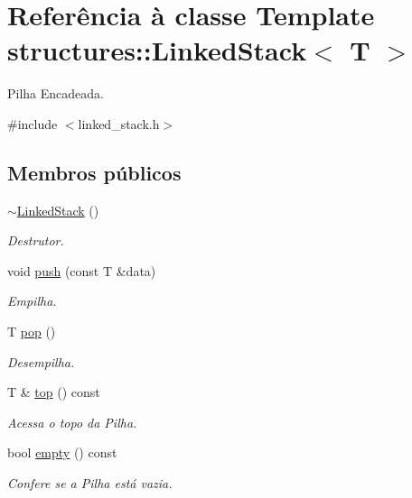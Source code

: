 \hypertarget{classstructures_1_1_linked_stack}{}\section{Referência à classe Template structures\+::Linked\+Stack$<$ T $>$}
\label{classstructures_1_1_linked_stack}


Pilha Encadeada.  




{\ttfamily \#include $<$linked\+\_\+stack.\+h$>$}

\subsection*{Membros públicos}
\begin{DoxyCompactItemize}
\item 
\mbox{\hyperlink{classstructures_1_1_linked_stack_ab2fdb20d8918bf824e50a9038acef636}{$\sim$\+Linked\+Stack}} ()
\begin{DoxyCompactList}\small\item\em Destrutor. \end{DoxyCompactList}\item 
void \mbox{\hyperlink{classstructures_1_1_linked_stack_a1af82de27376dbfb49c2872fef6cbcab}{push}} (const T \&data)
\begin{DoxyCompactList}\small\item\em Empilha. \end{DoxyCompactList}\item 
T \mbox{\hyperlink{classstructures_1_1_linked_stack_af831820610fd8e0a145757813a9afb4b}{pop}} ()
\begin{DoxyCompactList}\small\item\em Desempilha. \end{DoxyCompactList}\item 
T \& \mbox{\hyperlink{classstructures_1_1_linked_stack_ac1405eff07488586dced5275b97e562f}{top}} () const
\begin{DoxyCompactList}\small\item\em Acessa o topo da Pilha. \end{DoxyCompactList}\item 
bool \mbox{\hyperlink{classstructures_1_1_linked_stack_a42b81c0a1c2e0ab6ef2e0fe04a584001}{empty}} () const
\begin{DoxyCompactList}\small\item\em Confere se a Pilha está vazia. \end{DoxyCompactList}\item 

\end{DoxyCompactItemize}
